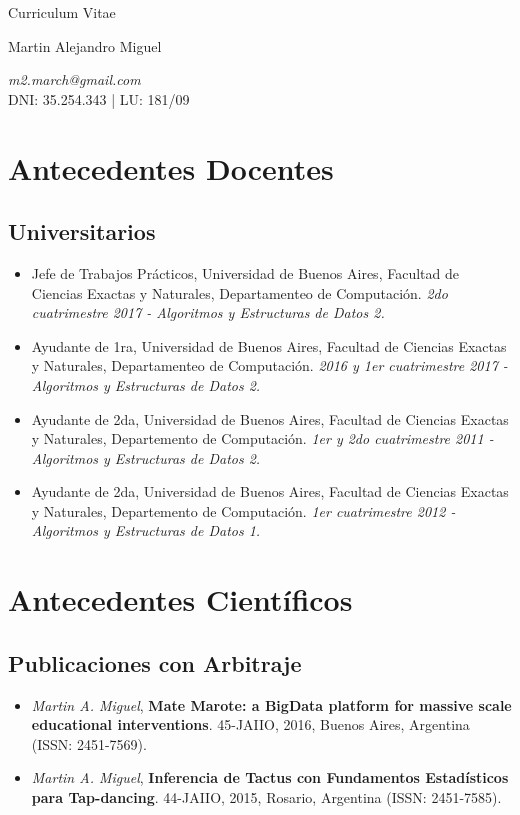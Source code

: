\documentclass[a4paper,10pt]{article}
\begin{document}
\begin{center}
    { \Huge
    Curriculum Vitae}
\bigskip

{\Large Martin Alejandro Miguel} \\
\medskip

\emph{m2.march@gmail.com} \\
DNI: 35.254.343 | LU: 181/09 
\end{center}


\section{Antecedentes Docentes}

\subsection{Universitarios}

\begin{itemize}
    \item Jefe de Trabajos Prácticos, Universidad de Buenos Aires, Facultad de
        Ciencias Exactas y Naturales, Departamenteo de Computación. \emph{2do
        cuatrimestre 2017 - Algoritmos y Estructuras de Datos 2.}
    \item Ayudante de 1ra, Universidad de Buenos Aires, Facultad de Ciencias
        Exactas y Naturales, Departamenteo de Computación. \emph{2016 y 1er
        cuatrimestre 2017 - Algoritmos y Estructuras de Datos 2.}
    \item Ayudante de 2da, Universidad de Buenos Aires, Facultad de Ciencias
        Exactas y Naturales, Departemento de Computación. \emph{1er y 2do
        cuatrimestre 2011 - Algoritmos y Estructuras de Datos 2.}
    \item Ayudante de 2da, Universidad de Buenos Aires, Facultad de Ciencias
        Exactas y Naturales, Departemento de Computación. \emph{1er
        cuatrimestre 2012 - Algoritmos y Estructuras de Datos 1.}
\end{itemize}

\section{Antecedentes Científicos}

\subsection{Publicaciones con Arbitraje}

\begin{itemize}
    \item 
\emph{Martin A. Miguel}, 
\textbf{Mate Marote: a BigData platform for massive scale educational
        interventions}.
        45-JAIIO, 2016, Buenos Aires, Argentina (ISSN: 2451-7569).
    \item 
\emph{Martin A. Miguel}, 
\textbf{Inferencia de Tactus con Fundamentos Estadísticos para Tap-dancing}.
        44-JAIIO, 2015, Rosario, Argentina (ISSN: 2451-7585).
\end{itemize}
\end{document}
